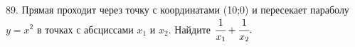 89. Прямая проходит через точку с координатами (10;0) и пересекает параболу $y=x^2$ в точках с абсциссами $x_1$ и $x_2.$ Найдите $\cfrac{1}{x_1}+\cfrac{1}{x_2}.$\\
